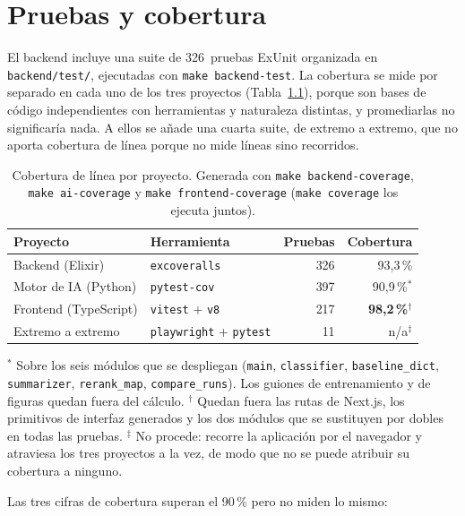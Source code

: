 \chapter{Pruebas y cobertura}
\label{cap:AnexoN}

El backend incluye una suite de 326~pruebas ExUnit organizada en \texttt{backend/test/}, ejecutadas con \texttt{make backend-test}. La cobertura se mide por separado en cada uno de los tres proyectos (Tabla~\ref{tab:cobertura}), porque son bases de código independientes con herramientas y naturaleza distintas, y promediarlas no significaría nada. A ellos se añade una cuarta suite, de extremo a extremo, que no aporta cobertura de línea porque no mide líneas sino recorridos.

\begin{table}[H]
\centering
\small
\caption{Cobertura de línea por proyecto. Generada con \texttt{make backend-coverage}, \texttt{make ai-coverage} y \texttt{make frontend-coverage} (\texttt{make coverage} los ejecuta juntos).}
\label{tab:cobertura}
\begin{tabular}{llrr}
\hline
\textbf{Proyecto} & \textbf{Herramienta} & \textbf{Pruebas} & \textbf{Cobertura} \\
\hline
Backend (Elixir) & \texttt{excoveralls} & 326 & 93{,}3\,\% \\
Motor de IA (Python) & \texttt{pytest-cov} & 397 & 90{,}9\,\%$^{*}$ \\
Frontend (TypeScript) & \texttt{vitest} + \texttt{v8} & 217 & \textbf{98{,}2\,\%}$^{\dagger}$ \\
Extremo a extremo & \texttt{playwright} + \texttt{pytest} & 11 & n/a$^{\ddagger}$ \\
\hline
\end{tabular}

\vspace{2mm}
{\footnotesize $^{*}$ Sobre los seis módulos que se despliegan (\texttt{main}, \texttt{classifier}, \texttt{baseline\_dict}, \texttt{summarizer}, \texttt{rerank\_map}, \texttt{compare\_runs}). Los guiones de entrenamiento y de figuras quedan fuera del cálculo. $^{\dagger}$ Quedan fuera las rutas de Next.js, los primitivos de interfaz generados y los dos módulos que se sustituyen por dobles en todas las pruebas. $^{\ddagger}$ No procede: recorre la aplicación por el navegador y atraviesa los tres proyectos a la vez, de modo que no se puede atribuir su cobertura a ninguno.}
\end{table}

Las tres cifras de cobertura superan el 90\,\% pero no miden lo mismo:

